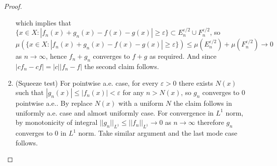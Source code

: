 \documentclass[a4paper]{article}
\begin{document}
\begin{proof}
\begin{enumerate}[label = (\roman*)]
$$    $$which implies that $\{x \in X : |f_n(x) + g_n(x) - f(x) - g(x)| \geq \varepsilon\} \subset E_n^{\varepsilon/2}\cup F_n^{\varepsilon/2}$,
    so$$
    \mu(\{x \in X : |f_n(x) + g_n(x) - f(x) - g(x)| \geq \varepsilon\}) \leq \mu(E_n^{\varepsilon/2}) + \mu(F_n^{\varepsilon/2})
    \to 0
    $$as $n \to \infty$, hence $f_n + g_n$ converges to $f + g$ as required.
    And since $|cf_n - cf| = |c||f_n - f|$ the second claim follows.
    \item (Squeeze test) For pointwise a.e. case, for every $\varepsilon > 0$ there exists $N(x)$ such that 
    $|g_n(x)| \leq |f_n(x)| < \varepsilon$ for any $n > N(x)$, so $g_n$ converges to 0 pointwise a.e.. By replace 
    $N(x)$ with a uniform $N$ the claim follows in uniformly a.e. case and almost uniformly case. For convergence 
    in $L^1$ norm, by monotonicity of integral $||g_n||_{L^1} \leq ||f_n||_{L^1} \to 0$ as $n \to \infty$ therefore
    $g_n$ converges to 0 in $L^1$ norm. Take similar argument and the last mode case follows. \qedhere
\end{enumerate}    
\end{proof}
\end{document}
